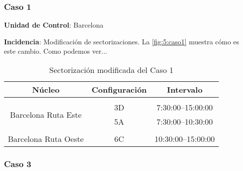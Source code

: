 \subsubsection{Caso 1}

\textbf{Unidad de Control}: Barcelona

\textbf{Incidencia}: Modificación de sectorizaciones. La \autoref{fig:5:caso1} muestra cómo es este cambio.
Como podemos ver...



\begin{table}[h]
		\centering
	\caption{Sectorización modificada del Caso 1}
	\begin{tabular}{ccc}
		\hline
		\textbf{Núcleo}                                           & \textbf{Configuración} & \textbf{Intervalo}   \\ \hline
		\multicolumn{1}{l}{}                                      & \multicolumn{1}{l}{}   & \multicolumn{1}{l}{} \\
		\multicolumn{1}{c|}{\multirow{2}{*}{Barcelona Ruta Este}} & 3D                     & 7:30:00--15:00:00    \\
		\multicolumn{1}{c|}{}                                     & 5A                     & 7:30:00--10:30:00    \\
		\multicolumn{1}{l}{}                                      & \multicolumn{1}{l}{}   & \multicolumn{1}{l}{} \\
		Barcelona Ruta Oeste                                      & 6C                     & 10:30:00--15:00:00   \\ \hline
	\end{tabular}
	\label{table:5:caso1-modif}
\end{table}


\subsubsection{Caso 3}

